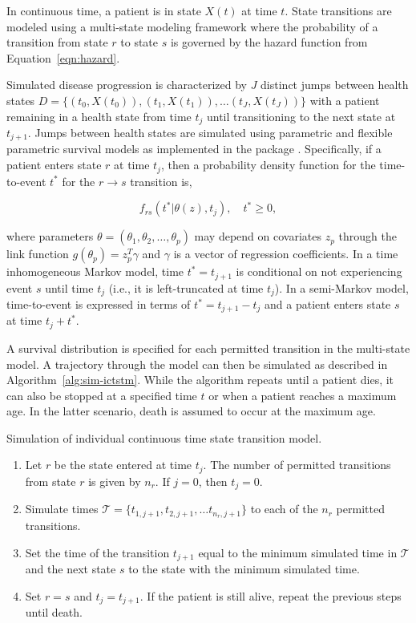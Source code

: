 \documentclass[article, nojss]{jss}\usepackage[]{graphicx}\usepackage[]{color}
\begin{document}
In continuous time, a patient is in state $X(t)$ at time $t$. State transitions are modeled using a multi-state modeling framework \citep{putter2007tutorial} where the probability of a transition from state $r$ to state $s$ is governed by the hazard function from Equation~\ref{eqn:hazard}.

Simulated disease progression is characterized by $J$ distinct jumps between health states $D = \{(t_0, X(t_0)), (t_1, X(t_1)), \ldots (t_J, X(t_J))\}$ with a patient remaining in a health state from time $t_j$ until transitioning to the next state at $t_{j+1}$. Jumps between health states are simulated using parametric and flexible parametric survival models as implemented in the  package \citep{jackson2016flexsurv}. Specifically, if a patient enters state $r$ at time $t_j$, then a probability density function for the time-to-event $t^*$ for the $r \rightarrow s$ transition is, 

\begin{equation}
f_{rs}(t^*|\theta(z), t_j), \quad t^*\geq 0,
\end{equation}

where parameters $\theta = (\theta_1, \theta_2, \ldots, \theta_p)$ may depend on covariates $z_p$ through the link function $g(\theta_p) = z_p^T \gamma$ and $\gamma$ is a vector of regression coefficients. In a time inhomogeneous Markov model, time $t^*=t_{j+1}$ is conditional on not experiencing event $s$ until time $t_j$ (i.e., it is left-truncated at time $t_j$). In a semi-Markov model, time-to-event is expressed in terms of $t^* = t_{j+1}-t_j$ and a patient enters state $s$ at time $t_j + t^*$.

A survival distribution is specified for each permitted transition in the multi-state model. A trajectory through the model can then be simulated as described in Algorithm~\ref{alg:sim-ictstm}. While the algorithm repeats until a patient dies, it can also be stopped at a specified time $t$ or when a patient reaches a maximum age. In the latter scenario, death is assumed to occur at the maximum age.
 
\begin{algorithm}
\caption{Simulation of individual continuous time state transition model.}
\label{alg:sim-ictstm}
\begin{enumerate}
\item Let $r$ be the state entered at time $t_j$. The number of permitted transitions from state $r$ is given by $n_r$. If $j=0$, then $t_j = 0$. 
\item Simulate times $\mathcal{T} = \{t_{1, j+1}, t_{2, j+1}, \ldots t_{n_r, j+1}\}$ to each of the $n_r$ permitted transitions.
\item Set the time of the transition $t_{j+1}$ equal to the minimum simulated time in $\mathcal{T}$ and the next state $s$ to the state with the minimum simulated time.
\item Set $r=s$ and $t_j = t_{j+1}$. If the patient is still alive, repeat the previous steps until death.
\end{enumerate}
\end{algorithm}
\end{document}
